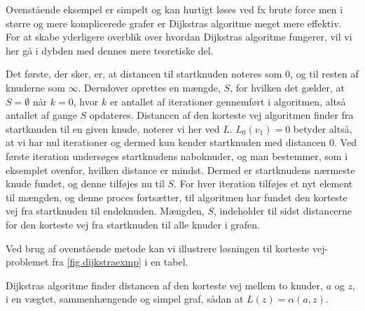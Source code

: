 Ovenstående eksempel er simpelt og kan hurtigt løses ved fx brute force men i større og mere komplicerede grafer er Dijkstras algoritme meget mere effektiv. For at skabe yderligere overblik over hvordan Dijkstras algoritme fungerer, vil vi her gå i dybden med dennes mere teoretiske del.

Det første, der sker, er, at distancen til startknuden noteres som $0$, og til resten af knuderne som $\infty$. Derudover oprettes en mængde, $S$, for hvilken det gælder, at $S = \emptyset$ når $k = 0$, hvor $k$ er antallet af iterationer gennemført i algoritmen, altså antallet af gange $S$ opdateres. Distancen af den korteste vej algoritmen finder fra startknuden til en given knude, noterer vi her ved $L$. $L_{0}(v_1)=0$ betyder altså, at vi har nul iterationer og dermed kun kender startknuden med distancen $0$. Ved første iteration undersøges startknudens naboknuder, og man bestemmer, som i eksemplet ovenfor, hvilken distance er mindst. Dermed er startknudens nærmeste knude fundet, og denne tilføjes nu til $S$. For hver iteration tilføjes et nyt element til mængden, og denne proces fortsætter, til algoritmen har fundet den korteste vej fra startknuden til endeknuden. Mængden, $S$, indeholder til sidst distancerne for den korteste vej fra startknuden til alle knuder i grafen. 

Ved brug af ovenstående metode kan vi illustrere løsningen til korteste vej-problemet fra \autoref{fig.dijkstraexmp} i en tabel.



\begin{thm} \label{thm:dijkstra}
Dijkstras algoritme finder distancen af den korteste vej mellem to knuder, $a$ og $z$, i en vægtet, sammenhængende og simpel graf, sådan at $L(z)=\alpha(a,z)$. 
\end{thm}

